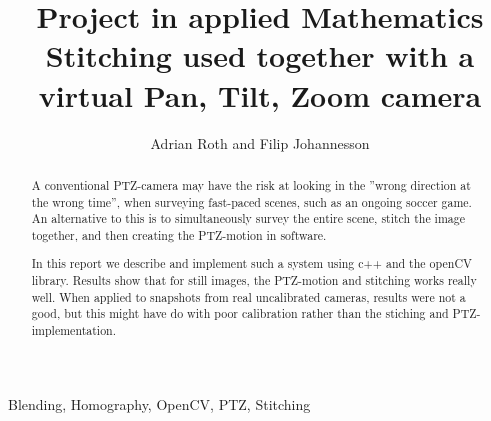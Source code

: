 \documentclass[10 pt, journal]{IEEEtran}
\title{Project in applied Mathematics \\
  \large Stitching used together with a virtual Pan, Tilt, Zoom camera}
\author{Adrian Roth and Filip Johannesson}
\begin{document}
\maketitle
\begin{abstract}
	A conventional PTZ-camera may have the risk at looking in the ''wrong direction at the wrong time'', when surveying fast-paced scenes, such as an ongoing soccer game. An alternative to this is to simultaneously survey the entire scene, stitch the image together, and then creating the PTZ-motion in software.

	In this report we describe and implement such a system using c++ and the openCV library. Results show that for still images, the PTZ-motion and stitching works really well. 
	When applied to snapshots from real uncalibrated cameras, results were not a good, but this might have do with poor calibration rather than the stiching and PTZ-implementation.
\end{abstract}
\begin{IEEEkeywords}
	Blending, Homography, OpenCV, PTZ, Stitching 
\end{IEEEkeywords}












\end{document}
